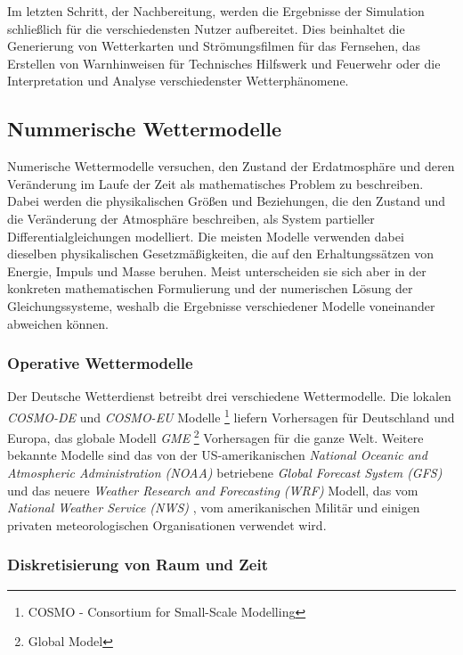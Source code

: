 Im letzten Schritt, der Nachbereitung, werden die Ergebnisse der
Simulation schließlich für die verschiedensten Nutzer
aufbereitet. Dies beinhaltet die Generierung von Wetterkarten und
Strömungsfilmen für das Fernsehen, das Erstellen von Warnhinweisen für
Technisches Hilfswerk und Feuerwehr oder die Interpretation und
Analyse verschiedenster Wetterphänomene.

\subsection{Nummerische Wettermodelle}
Numerische Wettermodelle versuchen, den Zustand der Erdatmosphäre und
deren Veränderung im Laufe der Zeit als mathematisches Problem zu
beschreiben. Dabei werden die physikalischen Größen und Beziehungen,
die den Zustand und die Veränderung der Atmosphäre beschreiben, als
System partieller Differentialgleichungen modelliert. Die meisten
Modelle verwenden dabei dieselben physikalischen Gesetzmäßigkeiten,
die auf den Erhaltungssätzen von Energie, Impuls und Masse
beruhen. Meist unterscheiden sie sich aber in der konkreten
mathematischen Formulierung und der numerischen Lösung der
Gleichungssysteme, weshalb die Ergebnisse verschiedener Modelle
voneinander abweichen können.

\subsubsection{Operative Wettermodelle}

Der Deutsche Wetterdienst betreibt drei verschiedene
Wettermodelle. Die lokalen \textit{COSMO-DE} und \textit{COSMO-EU}
Modelle \footnote{COSMO - Consortium for Small-Scale Modelling}
 liefern
Vorhersagen für Deutschland und Europa, das globale Modell
\textit{GME} \footnote{Global Model}  Vorhersagen für die ganze
Welt. Weitere bekannte Modelle sind das von der US-amerikanischen
\textit{National Oceanic and Atmospheric Administration (NOAA)}
betriebene \textit{Global Forecast System (GFS)}
 und das neuere
\textit{Weather Research and Forecasting (WRF)}
 Modell, das vom
\textit{National Weather Service (NWS)} , vom amerikanischen Militär und einigen privaten
meteorologischen Organisationen verwendet wird.

\subsubsection{Diskretisierung von Raum und Zeit}

